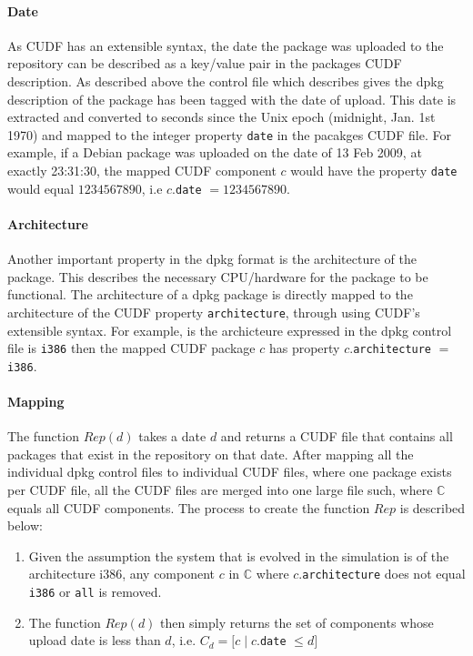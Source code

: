 \paragraph{Date}
As CUDF has an extensible syntax, the date the package was uploaded to the repository can be described as a key/value pair in the packages CUDF description.
As described above the control file which describes gives the dpkg description of the package has been tagged with the date of upload.
This date is extracted and converted to seconds since the Unix epoch (midnight, Jan. 1st 1970) and mapped to the integer property \verb+date+ in the pacakges CUDF file.
For example, if a Debian package was uploaded on the date of 13 Feb 2009, at exactly 23:31:30, 
the mapped CUDF component $c$ would have the property \verb+date+ would equal $1234567890$, i.e $c$.\verb+date+ $= 1234567890$.

\paragraph{Architecture}
Another important property in the dpkg format is the architecture of the package.
This describes the necessary CPU/hardware for the package to be functional.
The architecture of a dpkg package is directly mapped to the architecture of the CUDF property \verb+architecture+, through using CUDF's extensible syntax.
For example, is the archicteure expressed in the dpkg control file is \verb+i386+ then the mapped CUDF package $c$ has property $c$.\verb+architecture+ $=$ \verb+i386+.

\paragraph{Mapping}
The function $Rep(d)$ takes a date $d$ and returns a CUDF file that contains all packages that exist in the repository on that date.
After mapping all the individual dpkg control files to individual CUDF files, where one package exists per CUDF file,
all the CUDF files are merged into one large file such, where $\mathbb{C}$ equals all CUDF components.
The process to create the function $Rep$ is described below:
\begin{enumerate}
  \item Given the assumption the system that is evolved in the simulation is of the architecture i386, 
  any component $c$ in $\mathbb{C}$ where $c$.\verb+architecture+ does not equal \verb+i386+ or \verb+all+ is removed.
  \item The function $Rep(d)$ then simply returns the set of components whose upload date is less than $d$, i.e. $C_d = [c \mid c$.\verb+date+ $ \leq d]$
\end{enumerate}

